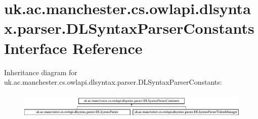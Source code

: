 \hypertarget{interfaceuk_1_1ac_1_1manchester_1_1cs_1_1owlapi_1_1dlsyntax_1_1parser_1_1_d_l_syntax_parser_constants}{\section{uk.\-ac.\-manchester.\-cs.\-owlapi.\-dlsyntax.\-parser.\-D\-L\-Syntax\-Parser\-Constants Interface Reference}
\label{interfaceuk_1_1ac_1_1manchester_1_1cs_1_1owlapi_1_1dlsyntax_1_1parser_1_1_d_l_syntax_parser_constants}
}
Inheritance diagram for uk.\-ac.\-manchester.\-cs.\-owlapi.\-dlsyntax.\-parser.\-D\-L\-Syntax\-Parser\-Constants\-:\begin{figure}[H]
\begin{center}
\leavevmode
\includegraphics[height=1.247216cm]{interfaceuk_1_1ac_1_1manchester_1_1cs_1_1owlapi_1_1dlsyntax_1_1parser_1_1_d_l_syntax_parser_constants}
\end{center}
\end{figure}
